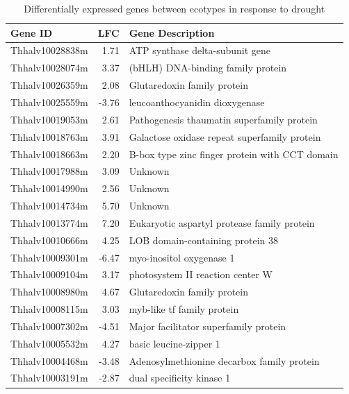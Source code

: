 \documentclass[12pt]{article}
\begin{document}
	\begin{table}[H]
		\centering

		\begin{tabular}{lrl}
			\toprule
			Gene ID & LFC & Gene Description \\
			\midrule
			\rowcolor{Gray}
			Thhalv10028838m & 1.71  & ATP synthase delta-subunit gene                          \\
			\rowcolor{Gray}
			Thhalv10028074m & 3.37   & (bHLH) DNA-binding family protein \\
			Thhalv10026359m & 2.08  & Glutaredoxin family protein                              \\
			\rowcolor{Gray}
			Thhalv10025559m & -3.76 & leucoanthocyanidin dioxygenase                           \\
			Thhalv10019053m & 2.61  & Pathogenesis thaumatin superfamily protein       \\
			\rowcolor{Gray}
			Thhalv10018763m & 3.91  & Galactose oxidase repeat superfamily protein       \\
			Thhalv10018663m & 2.20  & B-box type zinc finger protein with CCT domain           \\
			\rowcolor{Gray}
			Thhalv10017988m & 3.09  & Unknown                                                  \\
			Thhalv10014990m & 2.56  & Unknown                                                  \\
			\rowcolor{Gray}
			Thhalv10014734m & 5.70  & Unknown                                                  \\
			Thhalv10013774m & 7.20    & Eukaryotic aspartyl protease family protein              \\
			\rowcolor{Gray}
			Thhalv10010666m & 4.25  & LOB domain-containing protein 38                         \\
			Thhalv10009301m & -6.47  & myo-inositol oxygenase 1                                 \\
			\rowcolor{Gray}
			Thhalv10009104m & 3.17  & photosystem II reaction center W                         \\
			Thhalv10008980m & 4.67  & Glutaredoxin family protein                              \\
			\rowcolor{Gray}
			Thhalv10008115m & 3.03  & myb-like tf family protein             \\
			Thhalv10007302m & -4.51 & Major facilitator superfamily protein                    \\
			\rowcolor{Gray}
			Thhalv10005532m & 4.27  & basic leucine-zipper 1                                   \\
			Thhalv10004468m & -3.48 & Adenosylmethionine decarbox family protein          \\
			\rowcolor{Gray}
			Thhalv10003191m & -2.87 & dual specificity kinase 1 \\
			\bottomrule                            
		\end{tabular}
				\caption[Differentially expressed genes in response to drought]{Differentially expressed genes between ecotypes in response to drought}
				\label{drought_genes}
	\end{table}
	
\end{document}
